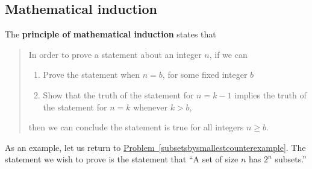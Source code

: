 \documentclass[10pt,]{book}
\newcommand{\terminology}[1]{\textbf{#1}}
\theoremstyle{plain}
\theoremstyle{definition}
\theoremstyle{definition}
\numberwithin{equation}{chapter}
\begin{document}
\subsection[{Mathematical induction}]{Mathematical induction}\label{subsection-74}
\hypertarget{p-1993}{}%
The \terminology{principle of mathematical induction} states that%
\begin{quote}\hypertarget{blockquote-19}{}
\hypertarget{p-1994}{}%
In order to prove a statement about an integer \(n\), if we can \leavevmode%
\begin{enumerate}
\item\hypertarget{li-132}{}\hypertarget{p-1995}{}%
Prove the statement when \(n=b\), for some fixed integer \(b\)%
\item\hypertarget{li-133}{}\hypertarget{p-1996}{}%
Show that the truth of the statement for \(n=k-1\) implies the truth of the statement for \(n=k\) whenever \(k>b\),%
\end{enumerate}
 then we can conclude the statement is true for all integers \(n\ge
b\).%
\end{quote}
\hypertarget{p-1997}{}%
As an example, let us return to \hyperref[subsetsbysmallestcounterexample]{Problem~\ref{subsetsbysmallestcounterexample}}. The statement we wish to prove is the statement that ``A set of size \(n\) has \(2^n\) subsets.''%
\end{document}
